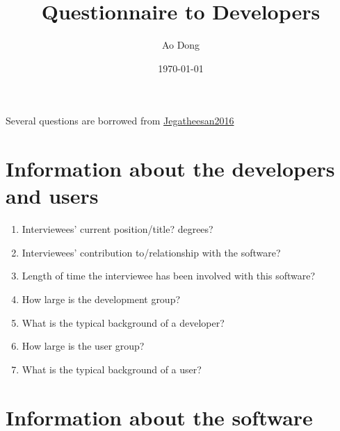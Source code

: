 \documentclass[12pt]{article}
\title{Questionnaire to Developers}
\author{Ao Dong}
\date{\today}
\begin{document}
\maketitle
Several questions are borrowed from
\href{https://gitlab.cas.mcmaster.ca/smiths/pub/-/blob/master/Jegatheesan2016.pdf}{Jegatheesan2016}

\section{Information about the developers and users}
\begin{enumerate}
\item Interviewees' current position/title? degrees?
\item Interviewees' contribution to/relationship with the software?
\item Length of time the interviewee has been involved with this software?
\item How large is the development group?
\item What is the typical background of a developer?
\item How large is the user group?
\item What is the typical background of a user?
\end{enumerate}

\section{Information about the software}
\end{document}
